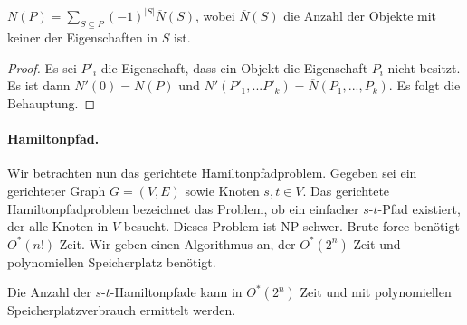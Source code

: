   
  \begin{corollary}
    \(N(P) = \sum_{S \subseteq P} (-1)^{|S|}\overline{N}(S)\), wobei \(\overline{N}(S)\) die Anzahl der Objekte mit keiner der Eigenschaften in \(S\) ist.
  \end{corollary}
  
  \begin{proof}
    Es sei \(P'_i\) die Eigenschaft, dass ein Objekt die Eigenschaft \(P_i\) nicht besitzt. Es ist dann \(N'(0) = N(P)\) und \(N'(P'_1, ... P'_k) = \overline{N}(P_1,...,P_k)\). Es folgt die Behauptung.
  \end{proof}
  
  \paragraph*{Hamiltonpfad.} Wir betrachten nun das gerichtete Hamiltonpfadproblem. Gegeben sei ein gerichteter Graph \(G = (V,E)\) sowie Knoten \(s,t \in V\). Das gerichtete Hamiltonpfadproblem bezeichnet das Problem, ob ein einfacher \(s\)-\(t\)-Pfad existiert, der alle Knoten in \(V\) besucht. Dieses Problem ist NP-schwer. Brute force benötigt \(O^*(n!)\) Zeit. Wir geben einen Algorithmus an, der \(O^*(2^n)\) Zeit und polynomiellen Speicherplatz benötigt.
  
  \begin{theorem}
    Die Anzahl der \(s\)-\(t\)-Hamiltonpfade kann in \(O^*(2^n)\) Zeit und mit polynomiellen Speicherplatzverbrauch ermittelt werden.
  \end{theorem}
  
